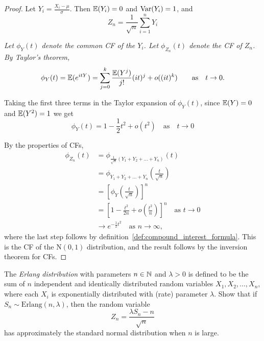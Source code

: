 \begin{proof}
Let $\displaystyle Y_i = \frac{X_i-\mu}{\sigma}$. Then $\mathbb{E}(Y_i)=0$ and $\text{Var}(Y_i)=1$, and 
\[
Z_n  = \frac{1}{\sqrt{n}}\sum_{i=1}^n Y_i 
\]

\bit
\it Let $\phi_Y(t)$ denote the common CF of the $Y_i$.
\it Let $\phi_{Z_n}(t)$ denote the CF of $Z_n$.
\eit
By Taylor's theorem, 
\[
\phi_Y(t) = \mathbb{E}(e^{itY}) = \sum_{j=0}^k \frac{\mathbb{E}(Y^j)}{j!}(it)^j + o((it)^k) \qquad\text{as}\quad t\to 0.
\]

Taking the first three terms in the Taylor expansion of $\phi_Y(t)$, since $\mathbb{E}(Y)=0$ and $\mathbb{E}(Y^2)=1$ we get
\[
\phi_Y(t) =  1 - \frac{1}{2}t^2 + o(t^2) \quad\text{as}\quad t\to 0
\]

By the properties of CFs, 
\begin{align*}
\phi_{Z_n}(t)
	& = \phi_{\frac{1}{\sqrt{n}}(Y_1+Y_2+\ldots+Y_n)}(t) \\
	& = \phi_{Y_1+Y_2+\ldots+Y_n}\left(\frac{t}{\sqrt{n}}\right) \\
	& = \left[\phi_Y\left(\frac{t}{\sqrt{n}}\right)\right]^n \\
	& = \left[1 - \frac{t^2}{2n} + o\left(\frac{t^2}{n}\right)\right]^n \quad\text{as $t\to 0$}\\
	& \to e^{-\frac{1}{2}t^2} \quad\text{as $n\to\infty$},
\end{align*}
where the last step follows by definition~\ref{def:compound_interest_formula}. This is the CF of the $\text{N}(0,1)$ distribution, and the result follows by the inversion theorem for CFs.
\end{proof}

\begin{example}
The \emph{Erlang distribution} with parameters $n\in\mathbb{N}$ and $\lambda>0$ is defined to be the sum of $n$ independent and identically distributed random variables $X_1,X_2,\ldots,X_n$, where each $X_i$ is exponentially distributed with (rate) parameter $\lambda$. Show that if $S_n\sim\text{Erlang}(n,\lambda)$, then the random variable 
\[
Z_n=\displaystyle\frac{\lambda S_n-n}{\sqrt{n}}
\]
has approximately the standard normal distribution when $n$ is large.
\end{example}

